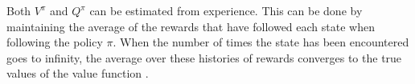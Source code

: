 Both $V^\pi$ and $Q^\pi$ can be estimated from experience. This can be done by
maintaining the average of the rewards that have followed each state when
following the policy $\pi$. When the number of times the state has been
encountered goes to infinity, the average over these histories of rewards
converges to the true values of the value function
\parencite{barto1998reinforcement}.






